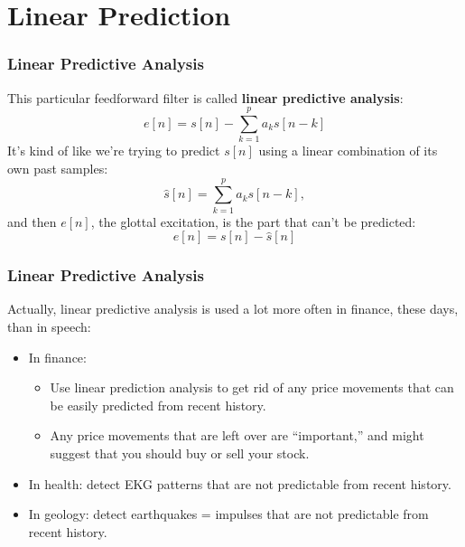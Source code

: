 \documentclass{beamer}
\begin{document}
\section[Linear Prediction]{Linear Prediction}
\setcounter{subsection}{1}

\begin{frame}
  \frametitle{Linear Predictive Analysis}

  This particular feedforward filter is called {\bf linear predictive
    analysis}:
  \begin{displaymath}
    e[n] = s[n] - \sum_{k=1}^p a_k s[n-k]
  \end{displaymath}
  It's kind of like we're trying to predict $s[n]$ using a linear
  combination of its own past samples:
  \begin{displaymath}
    \hat{s}[n] = \sum_{k=1}^p a_k s[n-k],
  \end{displaymath}
  and then $e[n]$, the glottal excitation, is the part that can't be
  predicted:
  \begin{displaymath}
    e[n] = s[n] - \hat{s}[n]
  \end{displaymath}
\end{frame}

\begin{frame}
  \frametitle{Linear Predictive Analysis}

  Actually, linear predictive analysis is used a lot more often in
  finance, these days, than in speech:
  \begin{itemize}
  \item In finance:
    \begin{itemize}
    \item Use linear prediction analysis to get rid of any price
      movements that can be easily predicted from recent history.
    \item Any price movements that are left over are ``important,''
      and might suggest that you should buy or sell your stock.
    \end{itemize}
  \item In health: detect EKG patterns that are not predictable from
    recent history.
  \item In geology: detect earthquakes = impulses that are not
    predictable from recent history.
  \end{itemize}
\end{frame}
    
\end{document}
